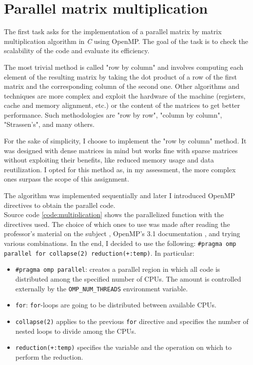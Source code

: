 \section{Parallel matrix multiplication}\label{sec:multiplication}

The first task asks for the implementation of a parallel matrix by matrix multiplication %
algorithm in \textit{C} using OpenMP. The goal of the task is to check the scalability %
of the code and evaluate its efficiency.

The most trivial method is called "row by column" and involves computing each element of the %
resulting matrix by taking the dot product of a row of the first matrix and the %
corresponding column of the second one. Other algorithms and %
techniques are more complex\cite{algorithms, ds-algorithms} and exploit the hardware %
of the machine (registers, cache and memory alignment, etc.) or the content of %
the matrices to get better performance. Such methodologies are %
"row by row", "column by column", "Strassen's", and many others.

For the sake of simplicity, I choose to implement the "row by column" method. %
It was designed with dense matrices in mind but works fine with sparse matrices %
without exploiting their benefits, like reduced memory usage and data reutilization. %
I opted for this method as, in my assessment, the more complex ones surpass the %
scope of this assignment.

The algorithm was implemented sequentially and later I introduced %
OpenMP directives to obtain the parallel code.\\%
Source code \ref{code:multiplication} shows the parallelized function with the %
directives used. The choice of which ones to use was made after reading %
the professor's material on the subject \cite{prof-slides}, OpenMP's 3.1 %
documentation \cite{openmp-cs, openmp-docs}, and trying various combinations. %
In the end, I decided to use the following: %
\texttt{\#pragma omp parallel for collapse(2) reduction(+:temp)}. In particular:
\begin{itemize}
    \item \texttt{\#pragma omp parallel}: creates a parallel region in which all %
        code is distributed among the specified number of CPUs. The amount is %
        controlled externally by the \texttt{OMP\_NUM\_THREADS} environment %
        variable.
    \item \texttt{for}: \texttt{for}-loops are going to be distributed between available %
        CPUs.
    \item \texttt{collapse(2)} applies to the previous \texttt{for} directive and %
        specifies the number of nested loops to divide among the CPUs.
    \item \texttt{reduction(+:temp)} specifies the variable and the operation on %
        which to perform the reduction.
\end{itemize}

